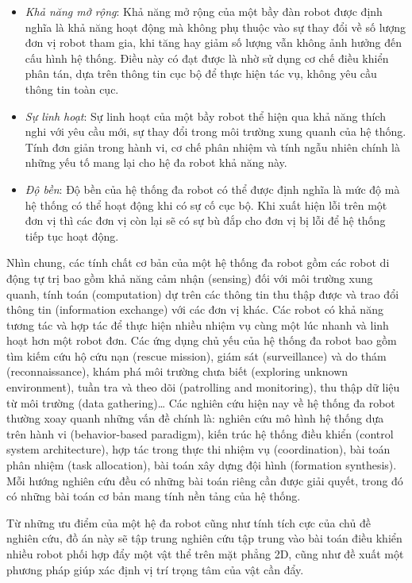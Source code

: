 \begin{itemize}
    \item \textit{Khả năng mở rộng}: Khả năng mở rộng của một bầy đàn robot được định nghĩa là khả năng hoạt động mà không phụ thuộc vào sự thay đổi về số lượng đơn vị robot tham gia, khi tăng hay giảm số lượng vẫn không ảnh hưởng đến cấu hình hệ thống. Điều này có đạt được là nhờ sử dụng cơ chế điều khiển phân tán, dựa trên thông tin cục bộ để thực hiện tác vụ, không yêu cầu thông tin toàn cục.
        \item \textit{Sự linh hoạt}: Sự linh hoạt của một bầy robot thể hiện qua khả năng thích nghi với yêu cầu mới, sự thay đổi trong môi trường xung quanh của hệ thống. Tính đơn giản trong hành vi, cơ chế phân nhiệm và tính ngẫu nhiên chính là những yếu tố mang lại cho hệ đa robot khả năng này.
    \item \textit{Độ bền}: Độ bền của hệ thống đa robot có thể được định nghĩa là mức độ mà hệ thống có thể hoạt động khi có sự cố cục bộ. Khi xuất hiện lỗi trên một đơn vị thì các đơn vị còn lại sẽ có sự bù đắp cho đơn vị bị lỗi để hệ thống tiếp tục hoạt động.
\end{itemize}

Nhìn chung, các tính chất cơ bản của một hệ thống đa robot gồm các robot di động tự trị bao gồm khả năng cảm nhận (sensing) đối với môi trường xung quanh, tính toán (computation) dự trên các thông tin thu thập được và trao đổi thông tin (information exchange) với các đơn vị khác. Các robot có khả năng tương tác và hợp tác để thực hiện nhiều nhiệm vụ cùng một lúc nhanh và linh hoạt hơn một robot đơn.
Các ứng dụng chủ yếu của hệ thống đa robot bao gồm tìm kiếm cứu hộ cứu nạn (rescue mission), giám sát (surveillance) và do thám (reconnaissance), khám phá môi trường chưa biết (exploring unknown environment), tuần tra và theo dõi (patrolling and monitoring), thu thập dữ liệu từ môi trường (data gathering)… Các nghiên cứu hiện nay về hệ thống đa robot thường xoay quanh những vấn đề chính là: nghiên cứu mô hình hệ thống dựa trên hành vi (behavior-based paradigm), kiến trúc hệ thống điều khiển (control system architecture), hợp tác trong thực thi nhiệm vụ (coordination), bài toán phân nhiệm (task allocation)\cite{doi:10.1177/0278364906063426}, bài toán xây dựng đội hình (formation synthesis). Mỗi hướng nghiên cứu đều có những bài toán riêng cần được giải quyết, trong đó có những bài toán cơ bản mang tính nền tảng của hệ thống.

Từ những ưu điểm của một hệ đa robot cũng như tính tích cực của chủ đề nghiên cứu, đồ án này sẽ tập trung nghiên cứu tập trung vào bài toán điều khiển nhiều robot phối hợp đẩy một vật thể trên mặt phẳng 2D, cũng như đề xuất một phương pháp giúp xác định vị trí trọng tâm của vật cần đẩy.